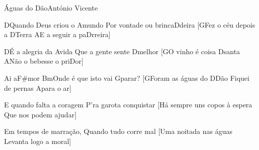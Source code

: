 \begin{musica}{Águas do Dão}{António Vicente}{}

\ac{D}{Quan}do Deus criou o \ac{A}{mun}do
Por vontade ou brinca\ac{D}{dei}ra
[\ac{G}{Fez} o céu depois a \ac{D}{Te}rra
\ac{A}{E} a seguir a pa\ac{D}{rrei}ra] 

\ac{D}{É} a alegria da \ac{A}{vi}da
Que a gente sente \ac{D}{me}lhor
[\ac{G}{O} vinho é coisa \ac{D}{san}ta
\ac{A}{Não} o bebesse o pri\ac{D}{or}] 

Ai a\ac{F#}{mor}
\ac{Bm}{On}de é que isto vai \ac{G}{pa}rar?
[\ac{G}{Fo}ram as águas do \ac{D}{Dão}
Fiquei de pernas \ac{A}{pa}ra o ar] 


E quando falta a coragem
P'ra garota conquistar
[Há sempre uns copos à espera
Que nos podem ajudar] 

Em tempos de marração,
Quando tudo corre mal
[Uma noitada nas águas
Levanta logo a moral] 


\end{musica}
